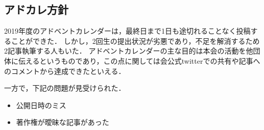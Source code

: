 \subsection*{アドカレ方針}


2019年度のアドベントカレンダーは，最終日まで1日も途切れることなく投稿することができた．
しかし，2回生の提出状況が劣悪であり，不足を解消するため2記事執筆する人もいた．
アドベントカレンダーの主な目的は本会の活動を他団体に伝えるというものであり，この点に関しては会公式twitterでの共有や記事へのコメントから達成できたといえる．

一方で，下記の問題が見受けられた．
\begin{itemize}
\item 公開日時のミス
\item 著作権が曖昧な記事があった
\end{itemize}

